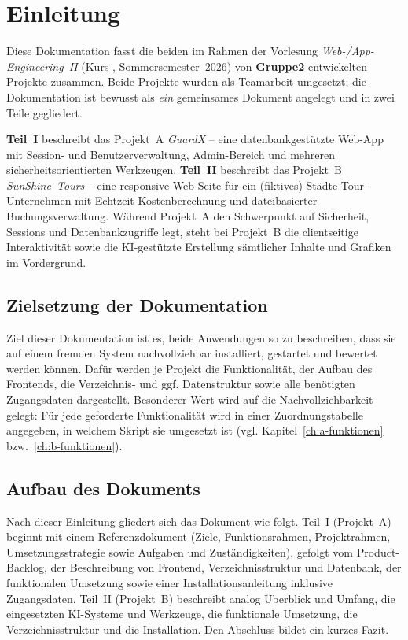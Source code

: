 \chapter{Einleitung}
\label{ch:einleitung}

Diese Dokumentation fasst die beiden im Rahmen der Vorlesung \emph{Web-/App-Engineering~II}
(Kurs \DieKursbezeichnung, Sommersemester~2026) von \textbf{Gruppe2} entwickelten Projekte zusammen.
Beide Projekte wurden als Teamarbeit umgesetzt; die Dokumentation ist bewusst als \emph{ein}
gemeinsames Dokument angelegt und in zwei Teile gegliedert.

\textbf{Teil~I} beschreibt das Projekt~A \emph{GuardX} -- eine datenbankgest\"utzte Web-App mit
Session- und Benutzerverwaltung, Admin-Bereich und mehreren sicherheitsorientierten Werkzeugen.
\textbf{Teil~II} beschreibt das Projekt~B \emph{SunShine~Tours} -- eine responsive Web-Seite f\"ur
ein (fiktives) St\"adte-Tour-Unternehmen mit Echtzeit-Kostenberechnung und dateibasierter
Buchungsverwaltung. W\"ahrend Projekt~A den Schwerpunkt auf Sicherheit, Sessions und
Datenbankzugriffe legt, steht bei Projekt~B die clientseitige Interaktivit\"at sowie die
KI-gest\"utzte Erstellung s\"amtlicher Inhalte und Grafiken im Vordergrund.

\section{Zielsetzung der Dokumentation}
Ziel dieser Dokumentation ist es, beide Anwendungen so zu beschreiben, dass sie auf einem
fremden System nachvollziehbar installiert, gestartet und bewertet werden k\"onnen. Daf\"ur werden
je Projekt die Funktionalit\"at, der Aufbau des Frontends, die Verzeichnis- und ggf.
Datenstruktur sowie alle ben\"otigten Zugangsdaten dargestellt. Besonderer Wert wird auf die
Nachvollziehbarkeit gelegt: F\"ur jede geforderte Funktionalit\"at wird in einer
Zuordnungstabelle angegeben, in welchem Skript sie umgesetzt ist (vgl.
Kapitel~\ref{ch:a-funktionen} bzw.~\ref{ch:b-funktionen}).

\section{Aufbau des Dokuments}
Nach dieser Einleitung gliedert sich das Dokument wie folgt. Teil~I (Projekt~A) beginnt mit einem
Referenzdokument (Ziele, Funktionsrahmen, Projektrahmen, Umsetzungsstrategie sowie Aufgaben und
Zust\"andigkeiten), gefolgt vom Product-Backlog, der Beschreibung von Frontend, Verzeichnisstruktur
und Datenbank, der funktionalen Umsetzung sowie einer Installationsanleitung inklusive Zugangsdaten.
Teil~II (Projekt~B) beschreibt analog \"Uberblick und Umfang, die eingesetzten KI-Systeme und
Werkzeuge, die funktionale Umsetzung, die Verzeichnisstruktur und die Installation. Den Abschluss
bildet ein kurzes Fazit.
